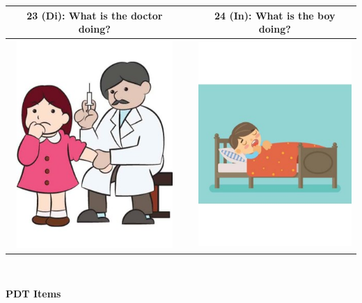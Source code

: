 \documentclass[12pt,notitlepage]{article}
\begin{document}
\begin{center}
\begin{tabular}{|c|c|c|}
\hline
23 (Di): What is the doctor doing? && 24 (In): What is the boy doing? \\
\hline
\includegraphics[width=16em,trim=0 0 0 -3]{figures/I23.jpg} & & \includegraphics[width=16em,trim=0 0 0 -3]{figures/I24.jpg} \\
\hline
\end{tabular}
\vspace{1em} \\


\clearpage

{\Large \textbf{PDT Items}}

\vspace{2em}


\end{center}
\end{document}
